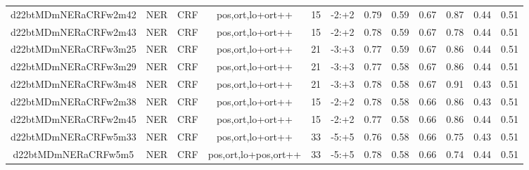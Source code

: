 \documentclass[a4paper]{article}
\begin{document}
\begin{landscape}
\begin{center}
\begin{tabular}{ |c|c|c|c|c|c|c|c|c|c|c|c|}
 	
 
 	
 		
 		\small{ d22btMDmNERaCRFw2m42 } & NER & CRF & pos,ort,lo+ort++  &  15 &  -2:+2  &  0.79 & 0.59 & 0.67  &  0.87 & 0.44 & 0.51 \\
 		

 	
 
 	
 		
 		\small{ d22btMDmNERaCRFw2m43 } & NER & CRF & pos,ort,lo+ort++  &  15 &  -2:+2  &  0.78 & 0.59 & 0.67  &  0.78 & 0.44 & 0.51 \\
 		

 	
 
 	
 		
 		\small{ d22btMDmNERaCRFw3m25 } & NER & CRF & pos,ort,lo+ort++  &  21 &  -3:+3  &  0.77 & 0.59 & 0.67  &  0.86 & 0.44 & 0.51 \\
 		

 	
 
 	
 		
 		\small{ d22btMDmNERaCRFw3m29 } & NER & CRF & pos,ort,lo+ort++  &  21 &  -3:+3  &  0.77 & 0.58 & 0.67  &  0.86 & 0.44 & 0.51 \\
 		

 	
 
 	
 		
 		\small{ d22btMDmNERaCRFw3m48 } & NER & CRF & pos,ort,lo+ort++  &  21 &  -3:+3  &  0.78 & 0.58 & 0.67  &  0.91 & 0.43 & 0.51 \\
 		

 	
 
 	
 		
 		\small{ d22btMDmNERaCRFw2m38 } & NER & CRF & pos,ort,lo+ort++  &  15 &  -2:+2  &  0.78 & 0.58 & 0.66  &  0.86 & 0.43 & 0.51 \\
 		

 	
 
 	
 		
 		\small{ d22btMDmNERaCRFw2m45 } & NER & CRF & pos,ort,lo+ort++  &  15 &  -2:+2  &  0.77 & 0.58 & 0.66  &  0.86 & 0.44 & 0.51 \\
 		

 	
 
 	
 		
 		\small{ d22btMDmNERaCRFw5m33 } & NER & CRF & pos,ort,lo+ort++  &  33 &  -5:+5  &  0.76 & 0.58 & 0.66  &  0.75 & 0.43 & 0.51 \\
 		

 	
 
 	
 		
 		\small{ d22btMDmNERaCRFw5m5 } & NER & CRF & pos,ort,lo+pos,ort++  &  33 &  -5:+5  &  0.78 & 0.58 & 0.66  &  0.74 & 0.44 & 0.51 \\
 		


\end{tabular}
\end{center}
\end{landscape}
\end{document}
